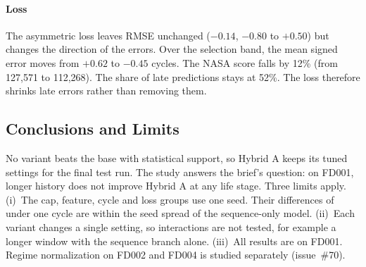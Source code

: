 \paragraph{Loss}
The asymmetric loss leaves RMSE unchanged ($-0.14$, $-0.80$ to $+0.50$)
but changes the direction of the errors. Over the selection band, the mean
signed error moves from $+0.62$ to $-0.45$ cycles. The NASA score falls by
12\% (from 127{,}571 to 112{,}268). The share of late predictions stays at
52\%. The loss therefore shrinks late errors rather than removing them.

\subsection{Conclusions and Limits}
No variant beats the base with statistical support, so Hybrid A keeps its
tuned settings for the final test run. The study answers the brief's question: on FD001,
longer history does not improve Hybrid A at any life stage. Three limits
apply. (i)~The cap, feature, cycle and loss groups use one seed. Their
differences of under one cycle are within the seed spread of the
sequence-only model. (ii)~Each variant changes a single setting, so
interactions are not tested, for example a longer window with the sequence
branch alone. (iii)~All results are on FD001. Regime normalization on
FD002 and FD004 is studied separately (issue~\#70).
